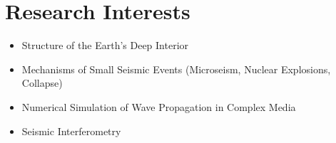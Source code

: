 \section*{Research Interests}

\begin{itemize}
\item Structure of the Earth's Deep Interior
\item Mechanisms of Small Seismic Events (Microseism, Nuclear Explosions, Collapse)
\item Numerical Simulation of Wave Propagation in Complex Media
\item Seismic Interferometry
\end{itemize}
